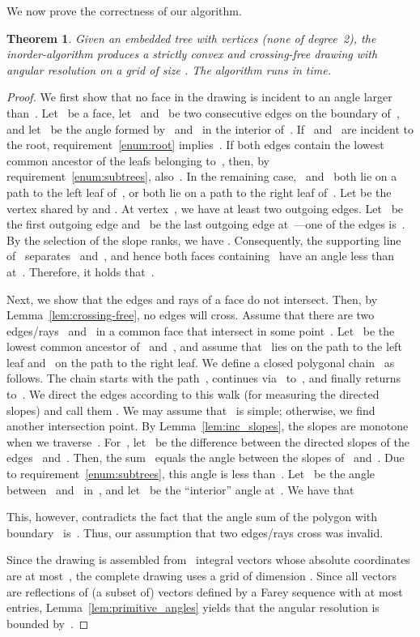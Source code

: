 \documentclass[a4paper,11pt]{article}
\theoremstyle{plain}
\newtheorem{theorem}{Theorem}
\begin{document}
We now prove the correctness of our algorithm.

\begin{theorem}\label{thm:correctness}
  Given an embedded tree with  vertices (none of degree~2), the 
	in\-order-algorithm produces a strictly convex and crossing-free drawing with
  angular resolution  on a grid of size .  The algorithm runs in  time.
\end{theorem}
\begin{proof}
	We first show that no face in the drawing is incident to an angle larger 
	than~. Let~ be a face, let~ and~ be two consecutive edges on 
	the boundary of~, and let~ be the angle formed by~ and~ in 
	the interior of~.  If~ and~ are incident to the root, 
	requirement~\ref{enum:root} implies~. If both edges contain the
	lowest common ancestor of the leafs belonging to~, then, by 
	requirement~\ref{enum:subtrees}, also~. In the remaining 
	case,~ and~ both lie on a path to the left leaf of~, or both lie on 
	a path to the right leaf of~. Let  be the vertex shared by  and .  At vertex~, we have at least two outgoing 
	edges. Let~ be the first outgoing edge and~ be the last outgoing 
edge at~---one of the edges is~. By the selection of the slope ranks,
	we have . Consequently, the supporting line of~ 
	separates~ and~, and hence both faces containing~ have an angle 
	less than~ at~. Therefore, it holds that~.
   
	Next, we show that the edges and rays of a face do not intersect. Then, by 
	Lemma~\ref{lem:crossing-free}, no edges will cross. Assume that there are two 
	edges/rays~ and~ in a common face that intersect in some point~. 
	Let~ be the lowest common ancestor of~ and~, and assume 
	that~ lies on the path to the left leaf and~ on the path to the 
	right leaf. We define a closed polygonal chain~ as follows. The chain 
	starts with the path~, continues via~ to~, and 
	finally returns to~. We direct the edges according to this walk (for 
	measuring the directed slopes) and call them . We may 
	assume that~ is simple; otherwise, we find another intersection point.  By 
	Lemma~\ref{lem:inc_slopes}, the slopes are monotone when we traverse~.  
	For~, let~ be the difference between the directed 
	slopes of the edges~ and~. Then, the sum~ 
	equals the angle between the slopes of~ and~.  Due to 
	requirement~\ref{enum:subtrees}, this angle is less than~. 
	Let~ be the angle between~ and~ in~,
	and let~ be the ``interior'' angle at~. We have that 
	 
	This, however, contradicts the fact that the angle sum of the polygon with 
	boundary~ is~. Thus, our assumption that two edges/rays cross was
	invalid.
   
  Since the drawing is assembled from~ integral vectors whose absolute coordinates
  are at most~, the complete drawing uses a grid of dimension
  .
  Since all vectors are reflections of (a subset of) vectors defined by a Farey
  sequence with at most~ entries, Lemma~\ref{lem:primitive_angles}
  yields that the angular resolution is bounded by~. 
\end{proof}
\end{document}
